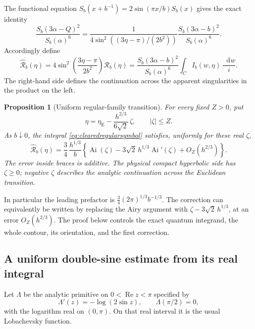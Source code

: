 \documentclass[11pt,a4paper]{article}
\numberwithin{equation}{section}
\newtheorem{proposition}[theorem]{Proposition}
\theoremstyle{definition}
\theoremstyle{remark}
\newcommand{\dd}{\mathop{}\!\mathrm d}
\begin{document}
The functional equation $S_b(x+b^{-1})=2\sin(\pi x/b)S_b(x)$
gives the exact identity
\begin{equation}
 \frac{S_b(3\alpha-Q)^2}{S_b(\alpha)^6}
 =
 \frac{1}{4\sin^2((3\eta-\pi)/(2b^2))}
 \frac{S_b(3\alpha-b)^2}{S_b(\alpha)^6}.
 \label{eq:externalpoleclearing}
\end{equation}
Accordingly define
\begin{equation}
 \widehat{\mathcal R}_b(\eta)
 =
 4\sin^2\!\left(\frac{3\eta-\pi}{2b^2}\right)\mathcal R_b(\eta)
 =
 \frac{S_b(3\alpha-b)^2}{S_b(\alpha)^6}
 \int_C I_b(w,\eta)\,\frac{\dd w}{i}.
 \label{eq:clearedregularsymbol}
\end{equation}
The right-hand side defines the continuation across the apparent
singularities in the product on the left.

\begin{proposition}[Uniform regular-family transition]
\label{prop:regularquantumAiry}
For every fixed $Z>0$, put
\[
 \eta=\eta_{\mathrm E}
       -\frac{h^{2/3}}{6\sqrt2}\,\zeta,
       \qquad |\zeta|\le Z.
\]
As $b\downarrow0$, the integral \eqref{eq:clearedregularsymbol}
satisfies, uniformly for these real $\zeta$,
\begin{equation}
 \boxed{\quad
 \widehat{\mathcal R}_b(\eta)=
 \frac34\,\frac{h^{1/3}}{b}
 \left\{
 \operatorname{Ai}(\zeta)
 -3\sqrt2\,h^{1/3}\operatorname{Ai}'(\zeta)
 +O_Z(h^{2/3})
 \right\}.
 \quad}
 \label{eq:quantumAirytheorem}
\end{equation}
The error inside braces is additive. The physical compact
hyperbolic side has $\zeta\ge0$; negative $\zeta$ describes the
analytic continuation across the Euclidean transition.
\end{proposition}

In particular the leading prefactor is
$\frac34(2\pi)^{1/3}b^{-1/3}$. The correction can equivalently
be written by replacing the Airy argument with
$\zeta-3\sqrt2\,h^{1/3}$, at an error $O_Z(h^{2/3})$.
The proof below controls the exact quantum integrand, the whole
contour, its orientation, and the first correction.

\subsection{A uniform double-sine estimate from its real integral}

Let $\Lambda$ be the analytic primitive on
$0<\operatorname{Re}z<\pi$ specified by
\[
 \Lambda'(z)=-\log(2\sin z),\qquad \Lambda(\pi/2)=0,
\]
with the logarithm real on $(0,\pi)$. On that real interval it is
the usual Lobachevsky function.
\end{document}
